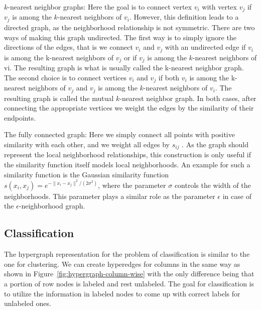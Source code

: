 $k$-nearest neighbor graphs: Here the goal is to connect vertex $v_i$ with vertex $v_j$ if $v_j$ is among the $k$-nearest neighbors of $v_i$. However, this definition leads to a directed graph, as the neighborhood relationship is not symmetric. There are two ways of making this graph undirected. The first way is to simply ignore the directions of the edges, that is we connect $v_i$ and $v_j$ with an undirected edge if $v_i$ is among the k-nearest neighbors of $v_j$ or if $v_j$ is among the $k$-nearest neighbors of vi. The resulting graph is what is usually called the k-nearest neighbor graph. The second choice is to connect vertices $v_i$ and $v_j$ if both $v_i$ is among the k-nearest neighbors of $v_j$ and $v_j$ is among the $k$-nearest neighbors of $v_i$. The resulting graph is called the mutual $k$-nearest neighbor graph. In both cases, after connecting the appropriate vertices we weight the edges by the similarity of their endpoints.

The fully connected graph: Here we simply connect all points with positive similarity with each other, and we weight all edges by $s_{ij}$ . As the graph should represent the local neighborhood relationships, this construction is only useful if the similarity function itself models local neighborhoods. An example for such a similarity function is the Gaussian similarity function $s(x_i, x_j) = e^{-\|x_i - x_j\|^2/(2\sigma^2)}$, where the parameter $\sigma$ controls the width of the neighborhoods. This parameter plays a similar role as the parameter $\epsilon$ in case of the $\epsilon$-neighborhood graph.


\subsection{Classification}
The hypergraph representation for the problem of classification is similar to the one for clustering. We can create hyperedges for columns in the same way as shown in Figure~\ref{fig:hypergraph-column-wise} with the only difference being that a portion of row nodes is labeled and rest unlabeled. The goal for classification is to utilize the information in labeled nodes to come up with correct labels for unlabeled ones.

